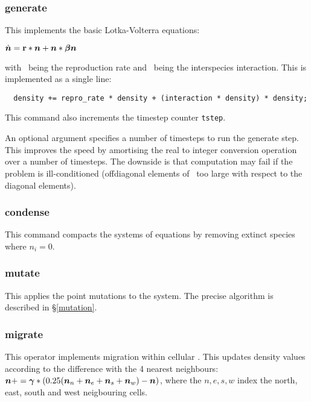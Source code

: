 \subsubsection{generate}

This implements the basic Lotka-Volterra equations:

\begin{math}
\dot{\mbox{\boldmath{$n$}}} = \mbox{${\bf r}$}*\mbox{\boldmath{$n$}} + \mbox{\boldmath{$n$}}*\mbox{\boldmath{$\beta$}}\mbox{\boldmath{$n$}}
\end{math}

with \br\ being the reproduction rate and \bbeta\ being the
interspecies interaction. This is implemented as a single line:

\begin{verbatim}
  density += repro_rate * density + (interaction * density) * density;
\end{verbatim}

This command also increments the timestep counter {\tt tstep}.

An optional argument specifies a number of timesteps to run the
generate step. This improves the speed by amortising the real to
integer conversion operation over a number of timesteps. The downside
is that computation may fail if the problem is ill-conditioned
(offdiagonal elements of \bbeta\ too large with respect to the
diagonal elements).

\subsubsection{condense}\label{condense}

This command compacts the systems of equations by removing extinct
species where $n_i=0$.

\subsubsection{mutate}\label{mutate}

This applies the point mutations to the system. The precise algorithm
is described in \S\ref{mutation}. 

\subsubsection{migrate}\label{migrate}

This operator implements migration within cellular \EcoLab{}. This
updates density values according to the difference with the 4 nearest
neighbours: $\mbox{\boldmath{$n$}}+=\mbox{\boldmath{$\gamma$}}*(0.25(\mbox{\boldmath{$n$}}_n+\mbox{\boldmath{$n$}}_e+\mbox{\boldmath{$n$}}_s+\mbox{\boldmath{$n$}}_w)-\mbox{\boldmath{$n$}})$, where the
$n,e,s,w$ index the north, east, south and west neigbouring cells.

